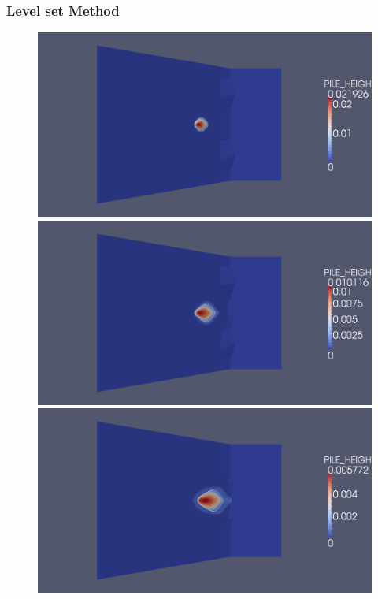 \documentclass[letterpaper,10pt]{article}
\begin{document}
\subsubsection{Level set Method}

\begin{figure}[H]
  \begin{minipage}[b]{.5\linewidth}
    \centering
    \includegraphics[width=1\textwidth]{IMAGES/level_set/1.png}
    \includegraphics[width=1\textwidth]{IMAGES/level_set/2.png}
    \includegraphics[width=1\textwidth]{IMAGES/level_set/3.png}

\end{minipage}
\end{figure}
\end{document}
